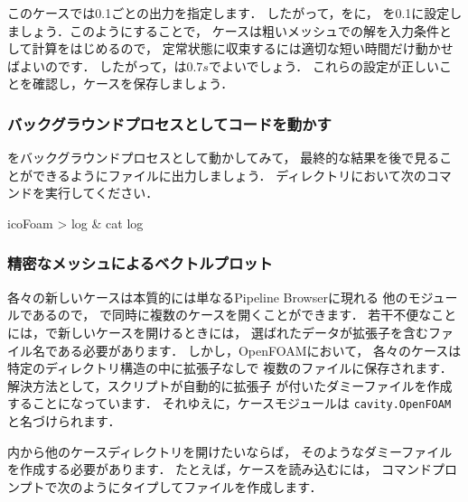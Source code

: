 このケースでは0.1ごとの出力を指定します．
したがって，をに，
%
%
を0.1に設定しましょう．このようにすることで，
ケースは粗いメッシュでの解を入力条件として計算をはじめるので，
定常状態に収束するには適切な短い時間だけ動かせばよいのです．
したがって，は$0.7\unit{s}$でよいでしょう．
これらの設定が正しいことを確認し，ケースを保存しましょう．

\subsubsection{バックグラウンドプロセスとしてコードを動かす}
\label{sssec:2.1.5.5}
をバックグラウンドプロセスとして動かしてみて，
最終的な結果を後で見ることができるようにファイルに出力しましょう．
ディレクトリにおいて次のコマンドを実行してください．
\begin{OFverbatim}[terminal]
icoFoam > log &
cat log
\end{OFverbatim}

\subsubsection{精密なメッシュによるベクトルプロット}
\label{sssec:2.1.5.6}
各々の新しいケースは本質的には単なるPipeline Browserに現れる
他のモジュールであるので，
で同時に複数のケースを開くことができます．
若干不便なことには，で新しいケースを開けるときには，
選ばれたデータが拡張子を含むファイル名である必要があります．
しかし，OpenFOAMにおいて，
各々のケースは特定のディレクトリ構造の中に拡張子なしで
複数のファイルに保存されます．
解決方法として，スクリプトが自動的に拡張子
が付いたダミーファイルを作成することになっています．
それゆえに，ケースモジュールは
\texttt{cavity.OpenFOAM}と名づけられます．

内から他のケースディレクトリを開けたいならば，
そのようなダミーファイルを作成する必要があります．
たとえば，ケースを読み込むには，
コマンドプロンプトで次のようにタイプしてファイルを作成します．

